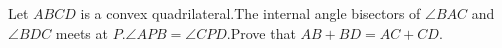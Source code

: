 Let $ABCD$ is a convex quadrilateral.The internal angle bisectors of $\angle {BAC}$ and $\angle {BDC}$ meets at $P$.$\angle {APB}=\angle {CPD}$.Prove that $AB+BD=AC+CD$.